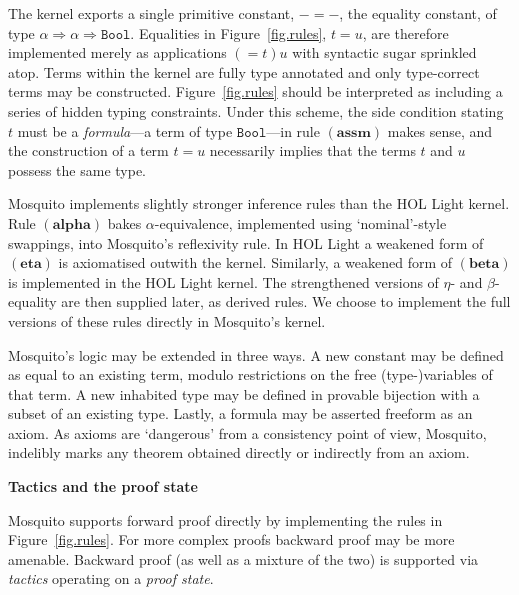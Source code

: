 \documentclass{llncs}
\newcommand{\mosquito}{Mosquito\xspace}
\newcommand{\rulefont}[1]{\ensuremath{(\mathbf{#1})}}
\begin{document}
The kernel exports a single primitive constant, $- = -$, the equality constant, of type $\alpha \Rightarrow \alpha \Rightarrow \mathtt{Bool}$.
Equalities in Figure~\ref{fig.rules}, $t = u$, are therefore implemented merely as applications $(= t) u$ with syntactic sugar sprinkled atop.
Terms within the kernel are fully type annotated and only type-correct terms may be constructed.
Figure~\ref{fig.rules} should be interpreted as including a series of hidden typing constraints.
Under this scheme, the side condition stating $t$ must be a \emph{formula}---a term of type $\mathtt{Bool}$---in rule \rulefont{assm} makes sense, and the construction of a term $t = u$ necessarily implies that the terms $t$ and $u$ possess the same type.

\mosquito implements slightly stronger inference rules than the HOL Light kernel.
Rule \rulefont{alpha} bakes $\alpha$-equivalence, implemented using `nominal'-style swappings, into \mosquito's reflexivity rule.
In HOL Light a weakened form of \rulefont{eta} is axiomatised outwith the kernel.
Similarly, a weakened form of \rulefont{beta} is implemented in the HOL Light kernel.
The strengthened versions of $\eta$- and $\beta$-equality are then supplied later, as derived rules.
We choose to implement the full versions of these rules directly in \mosquito's kernel.

\mosquito's logic may be extended in three ways.
A new constant may be defined as equal to an existing term, modulo restrictions on the free (type-)variables of that term.
A new inhabited type may be defined in provable bijection with a subset of an existing type.
Lastly, a formula may be asserted freeform as an axiom.
As axioms are `dangerous' from a consistency point of view, \mosquito, indelibly marks any theorem obtained directly or indirectly from an axiom.

\noindent\newline
\textbf{Tactics and the proof state}
\newline

\mosquito supports forward proof directly by implementing the rules in Figure~\ref{fig.rules}.
For more complex proofs backward proof may be more amenable.
Backward proof (as well as a mixture of the two) is supported via \emph{tactics} operating on a \emph{proof state}.
\end{document}
